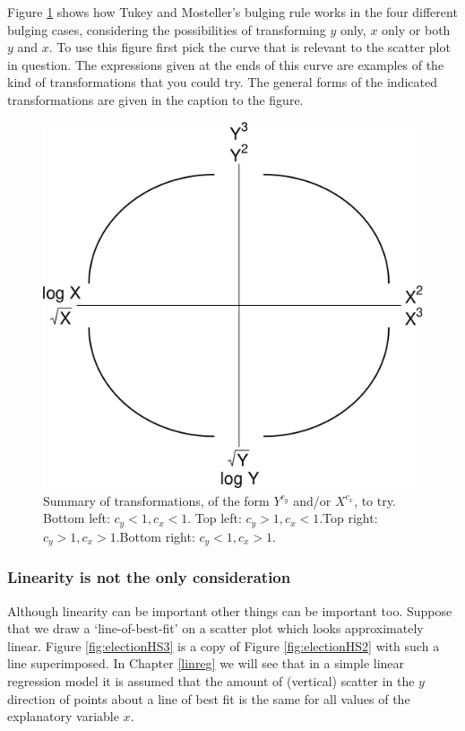 \documentclass[
  11pt,
  british,
  openany, a4paper]{book}
\begin{document}
Figure \ref{fig:tukey} shows how Tukey and Mosteller's bulging rule works in the four different bulging cases, considering the possibilities of transforming \(y\) only, \(x\) only or both \(y\) and \(x\). To use this figure first pick the curve that is relevant to the scatter plot in question. The expressions given at the ends of this curve are examples of the kind of transformations that you could try. The general forms of the indicated transformations are given in the caption to the figure.

\begin{figure}

{\centering \includegraphics[width=0.75\linewidth]{images/tukey} 

}

\caption{Summary of transformations, of the form $Y^{c_y}$ and/or $X^{c_x}$, to try. Bottom left: $c_y < 1, c_x < 1$. Top left: $c_y > 1, c_x < 1$.Top right: $c_y > 1, c_x > 1$.Bottom right: $c_y < 1, c_x > 1$.}\label{fig:tukey}
\end{figure}

\hypertarget{linearity-is-not-the-only-consideration}{%
\subsubsection*{Linearity is not the only consideration}\label{linearity-is-not-the-only-consideration}}

Although linearity can be important other things can be important too. Suppose that we draw a `line-of-best-fit' on a scatter plot which looks approximately linear. Figure \ref{fig:electionHS3} is a copy of Figure \ref{fig:electionHS2} with such a line superimposed. In Chapter \ref{linreg} we will see that in a simple linear regression model it is assumed that the amount of (vertical) scatter in the \(y\) direction of points about a line of best fit is the same for all values of the explanatory variable \(x\).
\end{document}
